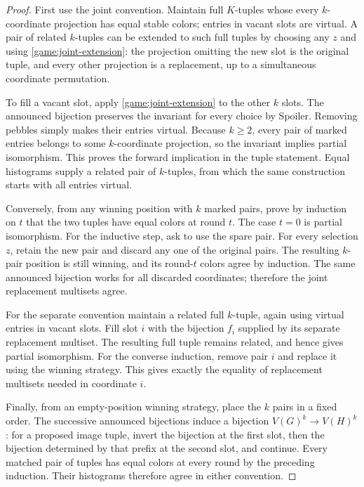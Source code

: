 \begin{proof}
First use the joint convention.  Maintain full $K$-tuples whose every
$k$-coordinate projection has equal stable colors; entries in vacant
slots are virtual.  A pair of related $k$-tuples can be extended to such
full tuples by choosing any $z$ and using
\eqref{game:joint-extension}: the projection omitting the new slot is
the original tuple, and every other projection is a replacement, up to
a simultaneous coordinate permutation.

To fill a vacant slot, apply \eqref{game:joint-extension} to the other
$k$ slots.  The announced bijection preserves the invariant for every
choice by Spoiler.  Removing pebbles simply makes their entries virtual.
Because $k\geq2$, every pair of marked entries belongs to some
$k$-coordinate projection, so the invariant implies partial
isomorphism.  This proves the forward implication in the tuple
statement.  Equal histograms supply a related pair of $k$-tuples, from
which the same construction starts with all entries virtual.

Conversely, from any winning position with $k$ marked pairs, prove by
induction on $t$ that the two tuples have equal colors at round $t$.
The case $t=0$ is partial isomorphism.  For the inductive step, ask to
use the spare pair.  For every selection $z$, retain the new pair and
discard any one of the original pairs.  The resulting $k$-pair position
is still winning, and its round-$t$ colors agree by induction.
The same announced bijection works for all discarded coordinates;
therefore the joint replacement multisets agree.

For the separate convention maintain a related full $k$-tuple, again
using virtual entries in vacant slots.  Fill slot $i$ with the bijection
$f_i$ supplied by its separate replacement multiset.  The resulting full
tuple remains related, and hence gives partial isomorphism.  For the
converse induction, remove pair $i$ and replace it using the winning
strategy.  This gives exactly the equality of replacement multisets
needed in coordinate $i$.

Finally, from an empty-position winning strategy, place the $k$ pairs
in a fixed order.  The successive announced bijections induce a
bijection $V(G)^k\to V(H)^k$: for a proposed image tuple, invert the
bijection at the first slot, then the bijection determined by that
prefix at the second slot, and continue.  Every matched pair of tuples
has equal colors at every round by the preceding induction.  Their
histograms therefore agree in either convention.
\end{proof}

